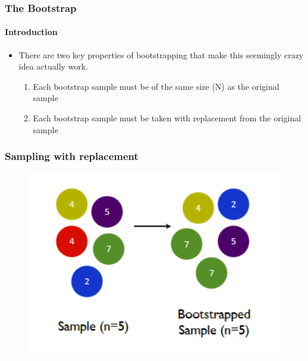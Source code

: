 \documentclass[
  shownotes,
  xcolor={svgnames},
  hyperref={colorlinks,citecolor=DarkBlue,linkcolor=andesred,urlcolor=DarkBlue}
  , aspectratio=169]{beamer}
\begin{document}
\begin{frame}[fragile]
\frametitle{The Bootstrap}
\framesubtitle{Introduction}

\begin{itemize}

  \item There are two key properties of bootstrapping that make this seemingly crazy idea actually work. 
  \medskip
  \begin{enumerate}
  \item Each bootstrap sample must be of the same size (N) as the original sample
  \medskip
  \item Each bootstrap sample must be taken with replacement from the original sample
\end{enumerate}

\end{itemize}
 \end{frame}
\begin{frame}[fragile]
\frametitle{Sampling with replacement}


\begin{figure}
  \includegraphics[scale=.3]{figures/bootstrap_cartoon1.png}
\end{figure}

\end{frame}
\end{document}
